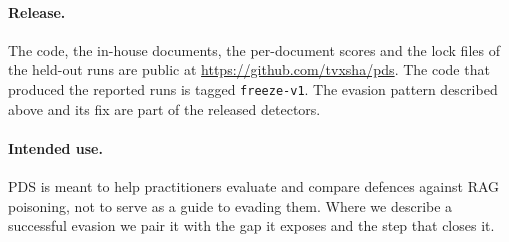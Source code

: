\paragraph{Release.}
The code, the in-house documents, the per-document scores and the lock files of
the held-out runs are public at \url{https://github.com/tvxsha/pds}. The code that
produced the reported runs is tagged \texttt{freeze-v1}. The evasion pattern
described above and its fix are part of the released detectors.

\paragraph{Intended use.}
PDS is meant to help practitioners evaluate and compare defences against RAG
poisoning, not to serve as a guide to evading them. Where we describe a successful
evasion we pair it with the gap it exposes and the step that closes it.